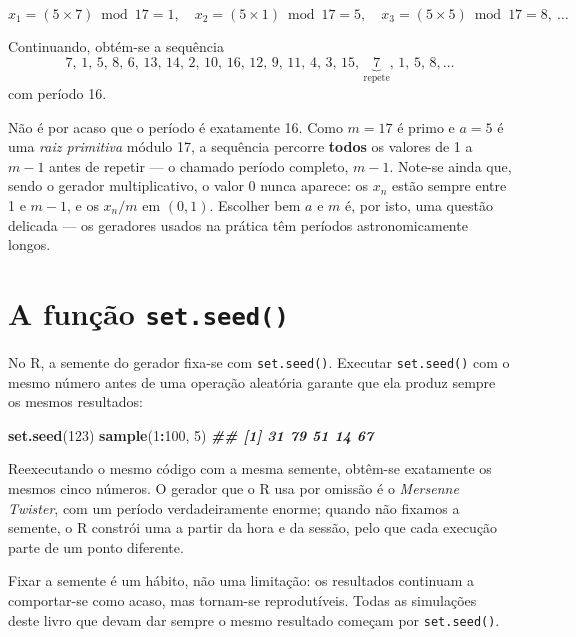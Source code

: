 \documentclass[
  portuguese,
  11pt,
  openany]{book}
\newenvironment{Shaded}{\begin{snugshade}}{\end{snugshade}}
\newcommand{\DecValTok}[1]{\textcolor[rgb]{0.00,0.00,0.81}{#1}}
\newcommand{\DocumentationTok}[1]{\textcolor[rgb]{0.56,0.35,0.01}{\textbf{\textit{#1}}}}
\newcommand{\FunctionTok}[1]{\textcolor[rgb]{0.13,0.29,0.53}{\textbf{#1}}}
\newcommand{\NormalTok}[1]{#1}
\newcommand{\SpecialCharTok}[1]{\textcolor[rgb]{0.81,0.36,0.00}{\textbf{#1}}}
\begin{document}
\[x_1 = (5 \times 7) \bmod 17 = 1, \quad x_2 = (5 \times 1) \bmod 17 = 5, \quad x_3 = (5 \times 5) \bmod 17 = 8, \ \ldots\]

Continuando, obtém-se a sequência
\[7,\, 1,\, 5,\, 8,\, 6,\, 13,\, 14,\, 2,\, 10,\, 16,\, 12,\, 9,\, 11,\, 4,\, 3,\, 15,\, \underbrace{7}_{\text{repete}},\, 1,\, 5,\, 8, \ldots\]
com período 16.

Não é por acaso que o período é exatamente 16. Como \(m = 17\) é primo e \(a = 5\) é uma
\emph{raiz primitiva} módulo 17, a sequência percorre \textbf{todos} os valores de 1 a \(m - 1\)
antes de repetir --- o chamado período completo, \(m - 1\). Note-se ainda que, sendo o
gerador multiplicativo, o valor 0 nunca aparece: os \(x_n\) estão sempre entre 1 e
\(m - 1\), e os \(x_n/m\) em \((0, 1)\). Escolher bem \(a\) e \(m\) é, por isto, uma questão
delicada --- os geradores usados na prática têm períodos astronomicamente longos.

\section{\texorpdfstring{A função \texttt{set.seed()}}{A função set.seed()}}\label{a-funuxe7uxe3o-set.seed}

No R, a semente do gerador fixa-se com \texttt{set.seed()}. Executar \texttt{set.seed()} com o mesmo
número antes de uma operação aleatória garante que ela produz sempre os mesmos
resultados:

\begin{Shaded}
\begin{Highlighting}[]
\FunctionTok{set.seed}\NormalTok{(}\DecValTok{123}\NormalTok{)}
\FunctionTok{sample}\NormalTok{(}\DecValTok{1}\SpecialCharTok{:}\DecValTok{100}\NormalTok{, }\DecValTok{5}\NormalTok{)}
\DocumentationTok{\#\# [1] 31 79 51 14 67}
\end{Highlighting}
\end{Shaded}

Reexecutando o mesmo código com a mesma semente, obtêm-se exatamente os mesmos cinco
números. O gerador que o R usa por omissão é o \emph{Mersenne Twister}, com um período
verdadeiramente enorme; quando não fixamos a semente, o R constrói uma a partir da hora
e da sessão, pelo que cada execução parte de um ponto diferente.

Fixar a semente é um hábito, não uma limitação: os resultados continuam a comportar-se
como acaso, mas tornam-se reprodutíveis. Todas as simulações deste livro que devam dar
sempre o mesmo resultado começam por \texttt{set.seed()}.
\end{document}
